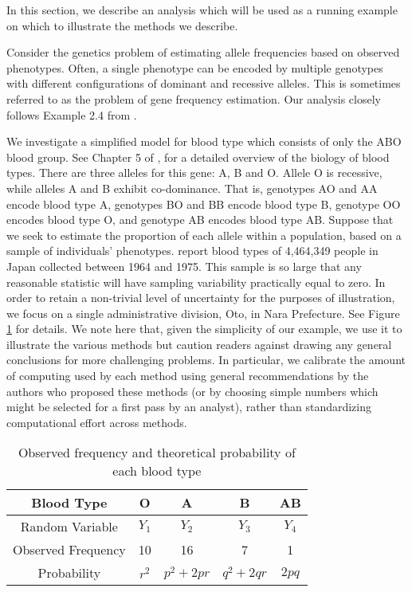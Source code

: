 \documentclass[11pt, oneside]{article}   	%
\begin{document}
In this section, we describe an analysis which will be used as a running example on which to illustrate the methods we describe. 

Consider the genetics problem of estimating allele frequencies based on observed phenotypes. Often, a single phenotype can be encoded by multiple genotypes with different configurations of dominant and recessive alleles. This is sometimes referred to as the problem of gene frequency estimation. Our analysis closely follows Example 2.4 from \citet{McL08}.%

We investigate a simplified model for blood type which consists of only the ABO blood group. See Chapter 5 of \citet{Dea05}, for a detailed overview of the biology of blood types. There are three alleles for this gene: A, B and O. Allele O is recessive, while alleles A and B exhibit co-dominance. That is, genotypes AO and AA encode blood type A, genotypes BO and BB encode blood type B, genotype OO encodes blood type O, and genotype AB encodes blood type AB. Suppose that we seek to estimate the proportion of each allele within a population, based on a sample of individuals' phenotypes. \citet{Fuj78} report blood types of 4,464,349 people in Japan collected between 1964 and 1975. This sample is so large that any reasonable statistic will have sampling variability practically equal to zero. In order to retain a non-trivial level of uncertainty for the purposes of illustration, we focus on a single administrative division, Oto, in Nara Prefecture. See Figure \ref{tab2:blood_type} for details. We note here that, given the simplicity of our example, we use it to illustrate the various methods but caution readers against drawing any general conclusions for more challenging problems. In particular, we calibrate the amount of computing used by each method using general recommendations by the authors who proposed these methods (or by choosing simple numbers which might be selected for a first pass by an analyst), rather than standardizing computational effort across methods.

\begin{table}
    \centering
    \caption{Observed frequency and theoretical probability of each blood type \citep{Fuj78}}
    \begin{tabular}{c|cccc}
        Blood Type & O & A & B & AB\\
        \hline
        Random Variable & $Y_1$ & $Y_2$ & $Y_3$ & $Y_4$\\
        Observed Frequency & 10 & 16 & 7 & 1\\
        Probability & $r^2$ & $p^2 + 2pr$ & $q^2 + 2qr$ & $2pq$
    \end{tabular}
    \label{tab2:blood_type}
\end{table}
\end{document}
